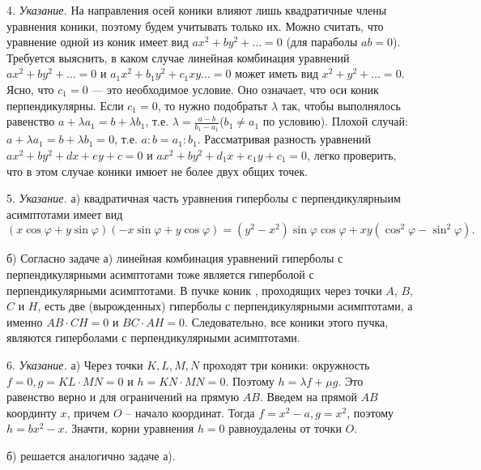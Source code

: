 4. \textit{Указание.} На направления осей коники влияют лишь квадратичные члены уравнения коники, поэтому будем учитывать только их. Можно считать, что уравнение одной из коник имеет вид $ax^2 + by^2 + \ldots = 0$ (для параболы $ab = 0$). Требуется выяснить, в каком случае линейная комбинация уравнений $ax^2 + by^2 + \ldots = 0$ и $a_1x^2 + b_1y^2 + c_1xy \ldots = 0$ может иметь вид $x^2 + y^2 + \ldots = 0$. Ясно, что $c_1 = 0$ — это необходимое условие. Оно означает, что оси коник перпендикулярны. Если $c_1 = 0$, то нужно подобратьт $\lambda$ так, чтобы выполнялось равенство $a + \lambda a_1 = b + \lambda b_1$, т.е. $\lambda = \frac{a - b}{b_1 - a_1}$($b_1 \ne a_1$ по условию). Плохой случай: $a + \lambda a_1 = b + \lambda b_1 = 0$, т.е. $a:b = a_1:b_1$. Рассматривая разность уравнений $ax^2 + by^2 + dx + ey + c =0$ и $ax^2 +by^2 + d_1 x + e_1 y + c_1 = 0$, легко проверить, что в этом случае коники имюет не более двух общих точек. 

5. \textit{Указание.}
 	а) квадратичная часть уравнения гиперболы с перпендикулярныим асимптотами имеет вид
	\[
		(x\cos\varphi + y\sin\varphi)(-x\sin\varphi + y\cos\varphi) = (y^2 - x^2)\sin\varphi \cos\varphi + xy(\cos^2 \varphi - \sin^2 \varphi).
	\]

	б) Согласно задаче а) линейная комбинация уравнений гиперболы с перпендикулярными асимптотами тоже является гиперболой с перпендикулярными асимптотами. В пучке коник , проходящих через точки $A$, $B$, $C$ и $H$, есть две (вырожденных) гиперболы с перпендикулярными асимптотами, а именно $AB \cdot CH = 0$ и $BC \cdot AH = 0.$ Следовательно, все коники этого пучка, являются гиперболами с перпендикулярными асимптотами.
 
6. \textit{Указание.} а) Через точки $K, L, M, N$ проходят три коники:
окружность $f = 0, g = KL \cdot MN = 0$ и $h = KN \cdot MN = 0$. Поэтому $h = \lambda f + \mu g$. Это равенство верно и для ограничений на прямую $AB$. Введем на прямой $AB$ координту $x$, причем $O$ -- начало координат. Тогда $f = x^2 - a, g = x^2$, поэтому $h = bx^2 - x$. Значти, корни уравнения $h = 0$ равноудалены от точки $O$.

б) решается аналогично задаче а).

